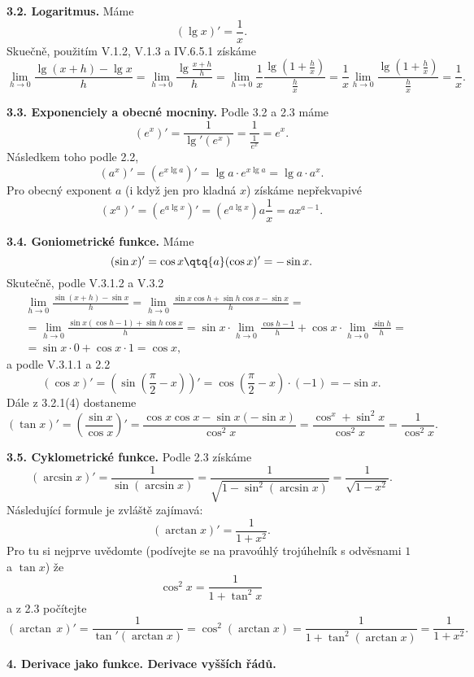 \documentclass[12pt]{article}
\begin{document}
{ \bigskip
 
 {\bf 3.2. Logaritmus.} Máme
 $$
 (\lg x)'=\frac1{x}.
 $$
 Skuečně, použitím V.1.2, V.1.3 a IV.6.5.1 získáme
 $$
 \lim_{h\to 0}\frac{\lg(x+h)-\lg x}{h}=\lim_{h\to 0}\frac{\lg\frac{x+h}{h}}{h}=
 \lim_{h\to 0}\frac1{x}\frac{\lg(1+\frac{h}{x})}{\frac{h}{x}}=
 \frac1{x}\lim_{h\to 0}\frac{\lg(1+\frac{h}{x})}{\frac{h}{x}}=\frac1{x}.
 $$
 
 \bigskip
 
 {\bf 3.3. Exponenciely a obecné mocniny.} Podle 3.2 a 2.3 máme
 $$
 (e^x)'=\frac{1}{\lg'(e^x)}=\frac{1}{\frac{1}{e^x}}=e^x.
 $$
 Následkem toho podle 2.2,
 $$
 (a^x)'=(e^{x\lg a})'=\lg a\cdot e^{x\lg a}=\lg a\cdot a^x.
 $$
Pro obecný exponent $a$ (i když jen pro kladná $x$) získáme nepřekvapivé
 $$
 (x^a)'=(e^{a\lg x})'=(e^{a\lg x})a\frac{1}{x}=a x^{a-1}.
 $$
 
 \bigskip
 
 {\bf 3.4. Goniometrické funkce.} Máme
 $$
 (\sin x)'=\cos x\qtq{a} (\cos x)'=-\sin x.
 $$
Skutečně, podle V.3.1.2 a V.3.2
 $$
 \begin{aligned}
 &\lim_{h\to 0}\frac{\sin(x+h)-\sin x}{h}=
 \lim_{h\to 0}\frac{\sin x\cos h+ \sin h\cos x-\sin x}{h}=\\
 &=\lim_{h\to 0}\frac{\sin x(\cos h-1)+ \sin h\cos x}{h}=
 \sin x\cdot\lim_{h\to 0}\frac{\cos h-1}{h}+\cos x\cdot\lim_{h\to 0}\frac{\sin h}{h}=\\
 &=\sin x\cdot 0+\cos x\cdot 1= \cos x, 
 \end{aligned}
 $$
 a podle V.3.1.1 a 2.2
 $$
 (\cos x)'=(\sin (\frac{\pi}{2}-x))'=\cos(\frac{\pi}{2}-x)\cdot(-1)=
 -\sin x.
 $$
 Dále z 3.2.1(4) dostaneme
 $$
 (\tan x)'=\left(\frac{\sin x}{\cos x}\right)'=\frac{\cos x\cos x-\sin x(-\sin x)}{\cos^2x}=
 \frac{\cos^x+\sin^2x}{\cos^2x}=\frac{1}{\cos^2x}.
 $$
 
 \bigskip
 
 {\bf  3.5. Cyklometrické funkce.} Podle 2.3 získáme
 $$
 (\arcsin x)'=\frac{1}{\sin(\arcsin x)}=\frac{1}{\sqrt{1-\sin^2(\arcsin x)}}=
 \frac{1}{\sqrt{1-x^2}}.
 $$
 Následující formule je zvláště zajímavá:
 $$
 (\arctan x)'=\frac{1}{1+x^2}.
 $$
 Pro tu si nejprve uvědomte (podívejte se na pravoúhlý trojúhelník s odvěsnami $1$ a $\tan x$) že
 $$
 \cos^2x=\frac1{1+\tan^2x}
 $$
 a z 2.3 počítejte
 $$
 (\arctan\, x)'=\frac1{\tan'(\arctan x)}=\cos^2(\arctan x)=\frac1{1+\tan^2(\arctan x)}=
 \frac1{1+x^2}.
 $$
 
 
 
 \vskip10mm
 
 {\large\bf 4. Derivace jako funkce. Derivace vyšších řádů.}
 
}
\end{document}
